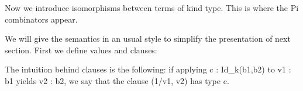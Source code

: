 \documentclass[preprint]{sigplanconf}
\begin{document}
Now we introduce isomorphisms between terms of kind {{type}}. This is where
the {{Pi}} combinators appear.

% 

%
%
%

We will give the semantics in an usual style to simplify the presentation of
next section. First we define values and clauses:


%
%

The intuition behind clauses is the following: if applying 
{{c : Id_k(b1,b2)}} to {{v1 : b1}} yields {{v2 : b2}}, we say that 
the clause {{ (1/v1, v2) }} has type {{c}}. 
\end{document}

